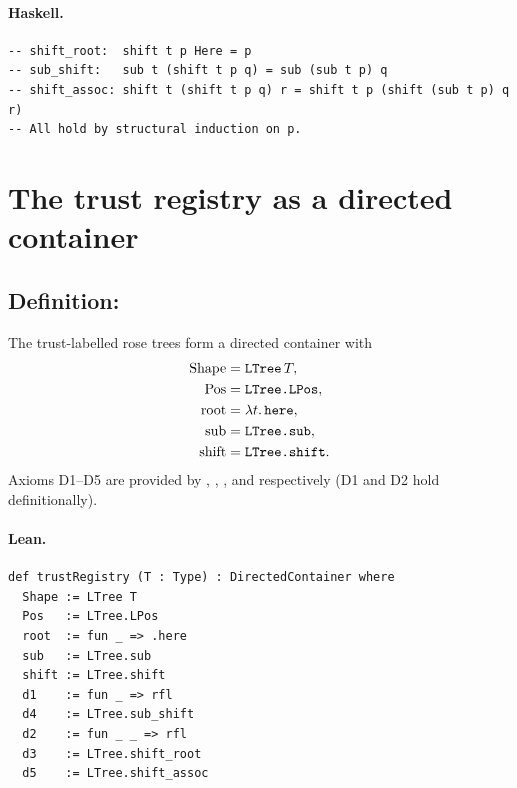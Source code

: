 \documentclass[11pt,a4paper]{article}
\begin{document}
\paragraph{Haskell.}
\begin{lstlisting}[style=haskell]
-- shift_root:  shift t p Here = p
-- sub_shift:   sub t (shift t p q) = sub (sub t p) q
-- shift_assoc: shift t (shift t p q) r = shift t p (shift (sub t p) q r)
-- All hold by structural induction on p.
\end{lstlisting}

\section{The trust registry as a directed container}

\subsection{Definition: }

\begin{defn}
The trust-labelled rose trees form a directed container with
\begin{align*}
  \mathrm{Shape} &= \texttt{LTree}\,T, \\
  \mathrm{Pos}   &= \texttt{LTree.LPos}, \\
  \mathrm{root}  &= \lambda t.\,\texttt{here}, \\
  \mathrm{sub}   &= \texttt{LTree.sub}, \\
  \mathrm{shift} &= \texttt{LTree.shift}.
\end{align*}
Axioms D1--D5 are provided by , , ,
and  respectively (D1 and D2 hold definitionally).
\end{defn}

\paragraph{Lean.}
\begin{lstlisting}[style=lean]
def trustRegistry (T : Type) : DirectedContainer where
  Shape := LTree T
  Pos   := LTree.LPos
  root  := fun _ => .here
  sub   := LTree.sub
  shift := LTree.shift
  d1    := fun _ => rfl
  d4    := LTree.sub_shift
  d2    := fun _ _ => rfl
  d3    := LTree.shift_root
  d5    := LTree.shift_assoc
\end{lstlisting}
\end{document}
